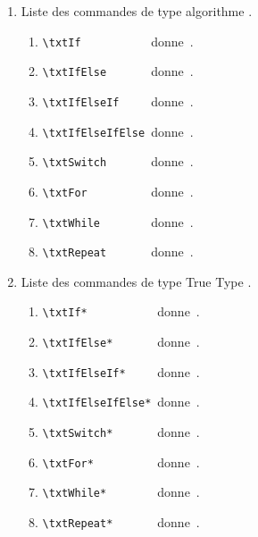 \documentclass[12pt,a4paper]{article}
\begin{document}
\begin{enumerate}

    \item Liste des commandes de type \og algorithme \fg{}.

    \begin{enumerate}[label=\alph*)]
        \item \verb#\txtIf          # \,donne\, \txtIf.
        \item \verb#\txtIfElse      # \,donne\, \txtIfElse.
        \item \verb#\txtIfElseIf    # \,donne\, \txtIfElseIf.
        \item \verb#\txtIfElseIfElse# \,donne\, \txtIfElseIfElse.
        \item \verb#\txtSwitch      # \,donne\, \txtSwitch.
    \smallskip
        \item \verb#\txtFor         # \,donne\, \txtFor.
        \item \verb#\txtWhile       # \,donne\, \txtWhile.
        \item \verb#\txtRepeat      # \,donne\, \txtRepeat.
    \end{enumerate}

    \item Liste des commandes de type \og True Type \fg{}.

    \begin{enumerate}[label=\alph*)]
        \item \verb#\txtIf*          # \,donne\, \txtIf*.
        \item \verb#\txtIfElse*      # \,donne\, \txtIfElse*.
        \item \verb#\txtIfElseIf*    # \,donne\, \txtIfElseIf*.
        \item \verb#\txtIfElseIfElse*# \,donne\, \txtIfElseIfElse*.
        \item \verb#\txtSwitch*      # \,donne\, \txtSwitch*.
    \smallskip
        \item \verb#\txtFor*         # \,donne\, \txtFor*.
        \item \verb#\txtWhile*       # \,donne\, \txtWhile*.
        \item \verb#\txtRepeat*      # \,donne\, \txtRepeat*.
    \end{enumerate}
\end{enumerate}

\end{document}
